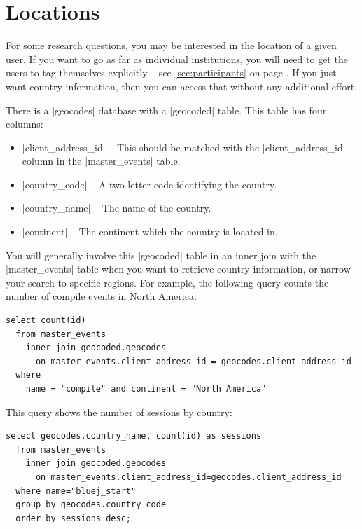\documentclass{report}
\newcommand{\myref}[1]{\autoref{#1} on page \pageref*{#1}}
\begin{document}
\newpage



\chapter{Locations}
\label{sec:locations}

For some research questions, you may be interested in the location of a given user.
If you want to go as far as individual institutions, you will need to get the users
to tag themselves explicitly -- see \myref{sec:participants}.  If you just want country
information, then you can access that without any additional effort.

There is a |geocodes| database with a |geocoded| table.  This table has four columns:
\begin{itemize}
\item |client_address_id| -- This should be matched with the |client_address_id| column
in the |master_events| table.
\item |country_code| -- A two letter code identifying the country.
\item |country_name| -- The name of the country.
\item |continent| -- The continent which the country is located in.
\end{itemize}

You will generally involve this |geocoded| table in an inner join with the |master_events| table when
you want to retrieve country information, or narrow your search to specific regions.  For example, the
following query counts the number of compile events in North America:

\begin{lstlisting}
select count(id)
  from master_events
    inner join geocoded.geocodes
      on master_events.client_address_id = geocodes.client_address_id
  where
    name = "compile" and continent = "North America"
\end{lstlisting}

This query shows the number of sessions by country:

\begin{lstlisting}
select geocodes.country_name, count(id) as sessions
  from master_events
    inner join geocoded.geocodes
      on master_events.client_address_id=geocodes.client_address_id
  where name="bluej_start"
  group by geocodes.country_code
  order by sessions desc; 
\end{lstlisting}
\end{document}
